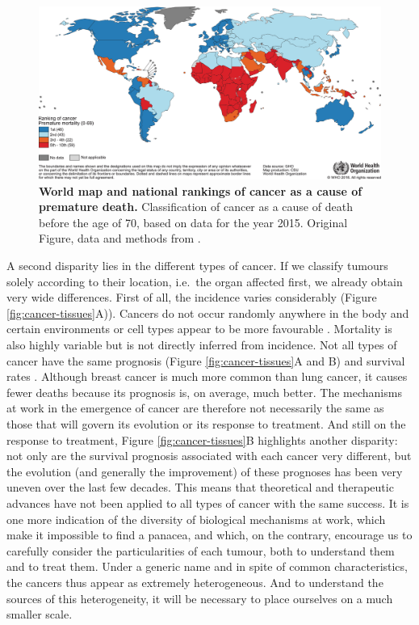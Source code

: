 \documentclass[a4paper,12pt,twoside,onecolumn,openright,final,oldfontcommands]{memoir}
\begin{document}
\begin{figure}

{\centering \includegraphics[width=0.9\linewidth]{fig/globocan-map} 

}

\caption[World map and national rankings of cancer as a cause of premature death]{\textbf{World map and national rankings of
cancer as a cause of premature death.} Classification of cancer as a
cause of death before the age of 70, based on data for the year 2015.
Original Figure, data and methods from \citet{bray2018global}.}\label{fig:globocan-map}
\end{figure}






A second disparity lies in the different types of cancer. If we classify
tumours solely according to their location, i.e.~the organ affected
first, we already obtain very wide differences. First of all, the
incidence varies considerably (Figure \ref{fig:cancer-tissues}A)).
Cancers do not occur randomly anywhere in the body and certain
environments or cell types appear to be more favourable
\citep{tomasetti2015variation}. Mortality is also highly variable but is
not directly inferred from incidence. Not all types of cancer have the
same prognosis (Figure \ref{fig:cancer-tissues}A and B) and survival
rates \citep{liu2018integrated}. Although breast cancer is much more
common than lung cancer, it causes fewer deaths because its prognosis
is, on average, much better. The mechanisms at work in the emergence of
cancer are therefore not necessarily the same as those that will govern
its evolution or its response to treatment. And still on the response to
treatment, Figure \ref{fig:cancer-tissues}B highlights another
disparity: not only are the survival prognosis associated with each
cancer very different, but the evolution (and generally the improvement)
of these prognoses has been very uneven over the last few decades. This
means that theoretical and therapeutic advances have not been applied to
all types of cancer with the same success. It is one more indication of
the diversity of biological mechanisms at work, which make it impossible
to find a panacea, and which, on the contrary, encourage us to carefully
consider the particularities of each tumour, both to understand them and
to treat them. Under a generic name and in spite of common
characteristics, the cancers thus appear as extremely heterogeneous. And
to understand the sources of this heterogeneity, it will be necessary to
place ourselves on a much smaller scale.
\end{document}
